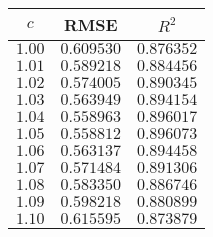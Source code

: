 \begin{tabular}{ccc} \toprule
$c$    & RMSE       & $R^2$      \\\midrule
$1.00$ & $0.609530$ & $0.876352$ \\
$1.01$ & $0.589218$ & $0.884456$ \\
$1.02$ & $0.574005$ & $0.890345$ \\
$1.03$ & $0.563949$ & $0.894154$ \\
$1.04$ & $0.558963$ & $0.896017$ \\
$1.05$ & $0.558812$ & $0.896073$ \\
$1.06$ & $0.563137$ & $0.894458$ \\
$1.07$ & $0.571484$ & $0.891306$ \\
$1.08$ & $0.583350$ & $0.886746$ \\
$1.09$ & $0.598218$ & $0.880899$ \\
$1.10$ & $0.615595$ & $0.873879$ \\\bottomrule
\end{tabular}
